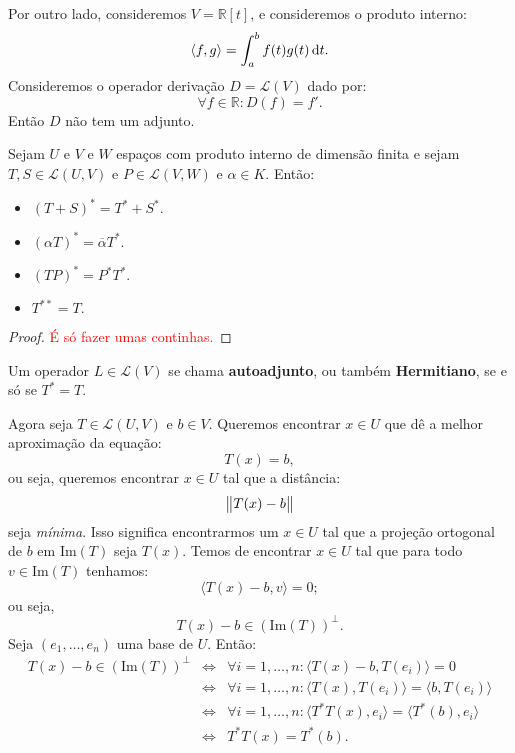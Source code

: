 \documentclass[11pt,twoside,a4paper]{book}
\begin{document}
\begin{observacao}
Por outro lado, consideremos $V=\mathbb{R}[t]$, e consideremos o produto interno:
\[
\langle f,g\rangle=\int_a^bf(t)g(t)\dif t.
\]
Consideremos o operador derivação $D=\mathcal{L}(V)$ dado por:
\[
\forall f\in\mathbb{R}:D(f)=f'.
\]
Então $D$ não tem um adjunto.
\end{observacao}

\begin{proposicao}
Sejam $U$ e $V$ e $W$ espaços com produto interno de dimensão finita e sejam $T,S\in\mathcal{L}(U,V)$ e $P\in\mathcal{L}(V,W)$ e $\alpha\in K$. Então:
\begin{itemize}
\item $(T+S)^*=T^*+S^*.$
\item $(\alpha T)^*=\overline{\alpha}T^*.$
\item $(TP)^*=P^*T^*.$
\item $T^{**}=T.$
\end{itemize}
\end{proposicao}
\begin{proof}
\textcolor{red}{É só fazer umas continhas.}
\end{proof}

\begin{definicao}
Um operador $L\in\mathcal{L}(V)$ se chama \textbf{autoadjunto}, ou também \textbf{Hermitiano}, se e só se $T^*=T.$
\end{definicao}

\noindent
Agora seja $T\in\mathcal{L}(U,V)$ e $b\in V$. Queremos encontrar $x\in U$ que dê a melhor aproximação da equação:
\[
T(x)=b,
\]
ou seja, queremos encontrar $x\in U$ tal que a distância:
\[
\norm{T(x)-b}
\]
seja \emph{mínima}. Isso significa encontrarmos um $x\in U$ tal que a projeção ortogonal de $b$ em $\mathrm{Im}(T)$ seja $T(x)$. Temos de encontrar $x\in U$ tal que para todo $v\in\mathrm{Im}(T)$ tenhamos:
\[
\langle T(x)-b,v\rangle=0;
\]
ou seja,
\[
T(x)-b\in(\mathrm{Im}(T))^\perp.
\]
Seja $(e_1,\dots,e_n)$ uma base de $U$. Então:
\[
\begin{array}{rcl}
T(x)-b\in(\mathrm{Im}(T))^\perp&\Leftrightarrow&\forall i=1,\dots,n:\langle T(x)-b,T(e_i)\rangle=0\\
&\Leftrightarrow&\forall i=1,\dots,n:\langle T(x),T(e_i)\rangle=\langle b,T(e_i)\rangle\\
&\Leftrightarrow&\forall i=1,\dots,n:\langle T^*T(x),e_i\rangle=\langle T^*(b),e_i\rangle\\
&\Leftrightarrow& T^*T(x)=T^*(b).
\end{array}
\]
\end{document}
